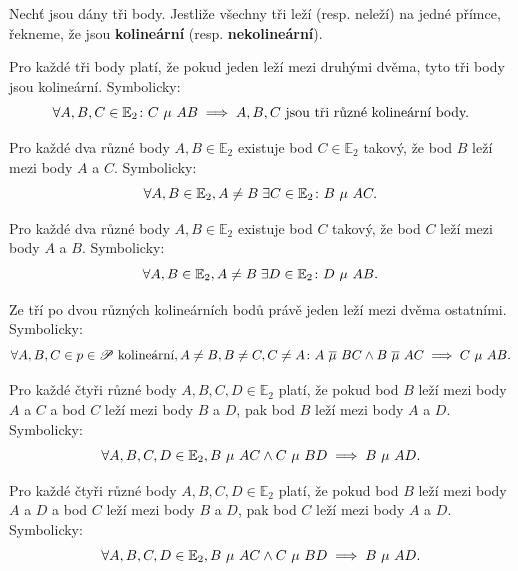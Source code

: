 \begin{definition}
  Nechť jsou dány tři body. Jestliže všechny tři leží (resp. neleží) na jedné přímce, řekneme, že jsou \textbf{kolineární} (resp. \textbf{nekolineární}).
\end{definition}

\begin{axiom}
  Pro každé tři body platí, že pokud jeden leží mezi druhými dvěma, tyto tři body jsou kolineární. Symbolicky:
  $$\forall A, B, C \in \mathbb E_2\colon C \operatorname{\,\mu\,} AB \implies A, B, C \text{ jsou tři různé kolineární body.}$$
\end{axiom}

\begin{axiom}
  Pro každé dva různé body $A,B \in \mathbb E_2$ existuje bod $C \in \mathbb E_2$ takový, že bod $B$ leží mezi body $A$ a $C$. Symbolicky:
  $$\forall A, B \in \mathbb E_2, A \neq B\; \exists C \in \mathbb E_2\colon B \operatorname{\,\mu\,} AC.$$
\end{axiom}

\begin{axiom}
Pro každé dva různé body $A,B\in \mathbb E_2$ existuje bod $C$ takový, že bod $C$ leží mezi body $A$ a $B$. Symbolicky:
$$\forall A, B \in \mathbb E_2, A \neq B\; \exists D \in \mathbb E_2\colon D \operatorname{\,\mu\,} AB.$$
\end{axiom}

\begin{axiom}
  Ze tří po dvou různých kolineárních bodů právě jeden leží mezi dvěma ostatními. Symbolicky:
  $$\forall A, B, C \in p \in \mathscr P \text{ kolineární}, A \neq B, B\neq C, C\neq A\colon A \operatorname{\,\overline{\mu}\,} BC \land B \operatorname{\,\overline{\mu}\,} AC \implies C \operatorname{\,\mu\,} AB.$$
\end{axiom}

\begin{axiom}
  Pro každé čtyři různé body $A,B,C,D\in \mathbb E_2$ platí, že pokud bod $B$ leží mezi body $A$ a $C$ a bod $C$ leží mezi body $B$ a $D$, pak bod $B$ leží mezi body $A$ a $D$. Symbolicky:
  $$\forall A, B, C, D \in \mathbb E_2, B \operatorname{\,\mu\,} AC \land C\operatorname{\,\mu\,} BD \implies B \operatorname{\,\mu\,} AD.$$
\end{axiom}

\begin{axiom}
  Pro každé čtyři různé body $A,B,C,D\in \mathbb E_2$ platí, že pokud bod $B$ leží mezi body $A$ a $D$ a bod $C$ leží mezi body $B$ a $D$, pak bod $C$ leží mezi body $A$ a $D$. Symbolicky:
  $$\forall A, B, C, D \in \mathbb E_2, B \operatorname{\,\mu\,} AC \land C\operatorname{\,\mu\,} BD \implies B \operatorname{\,\mu\,} AD.$$
\end{axiom}

